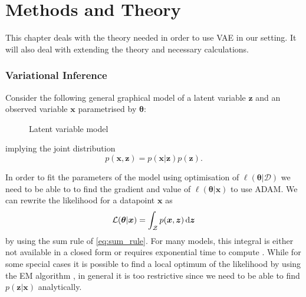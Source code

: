 \chapter{Methods and Theory}
\label{MethodsCh}

This chapter deals with the theory needed in order to use VAE in our setting. It
will also deal with extending the theory and necessary calculations.

\subsection{Variational Inference}
Consider the following general graphical model of a latent variable $\bm{z}$ and
an observed variable $\bm{x}$ parametrised by $\bm{\theta}$:
\begin{figure}[H]
  \label{tikz:latent_variable_model}
  \centering
  \caption{Latent variable model}
\end{figure}
implying the joint distribution
\begin{equation}
  \label{eq:latent_variable_model}
  p(\bm{x}, \bm{z}) = p(\bm{x} | \bm{z}) p(\bm{z}).
\end{equation}

In order to fit the parameters of the model using optimisation of
$\ell(\bm{\theta} | \mathcal{D})$ we need to be able to to find the gradient and
value of $\ell(\bm{\theta} | \bm{x})$ to use ADAM. We can rewrite
the likelihood for a datapoint $\bm{x}$ as
\begin{equation}
  \label{eq:likelihood_integrate_out_latent}
  \mathcal{L}(\bm{\theta} | \bm{x}) = \int_{\mathcal{Z}} p(\bm{x}, \bm{z}) \dif \bm{z}
\end{equation}
by using the sum rule of \ref{eq:sum_rule}. For many models, this integral is
either not available in a closed form or requires exponential time to compute
\cite{blei_variational_2017}. While for some special cases it is possible to
find a local optimum of the likelihood by using the EM algorithm
\cite{Dempster77maximumlikelihood}, in general it is too restrictive since we
need to be able to find $p(\bm{z} | \bm{x})$ analytically.

